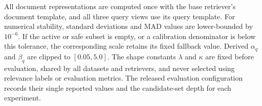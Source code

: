 \documentclass[letterpaper]{article}
\begin{document}
All document representations are computed once with the base
retriever's document template, and all three query views use its query
template.  For numerical stability, standard deviations and MAD values
are lower-bounded by $10^{-6}$.  If the active or safe subset is empty,
or a calibration denominator is below this tolerance, the corresponding
scale retains its fixed fallback value.  Derived $\alpha_q$ and
$\beta_q$ are clipped to $[0.05,5.0]$.  The shape constants $\lambda$
and $\kappa$ are fixed before evaluation, shared by all datasets and
retrievers, and never selected using relevance labels or evaluation
metrics.  The released evaluation configuration records their single
reported values and the candidate-set depth for each experiment.



\end{document}
